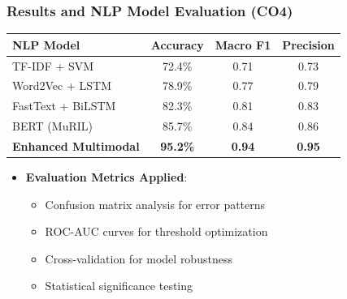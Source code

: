 \documentclass{beamer}
\begin{document}
\begin{frame}
\frametitle{Results and NLP Model Evaluation (CO4)}
\begin{table}
\centering
\begin{tabular}{lccc}
\toprule
\textbf{NLP Model} & \textbf{Accuracy} & \textbf{Macro F1} & \textbf{Precision} \\
\midrule
TF-IDF + SVM & 72.4\% & 0.71 & 0.73 \\
Word2Vec + LSTM & 78.9\% & 0.77 & 0.79 \\
FastText + BiLSTM & 82.3\% & 0.81 & 0.83 \\
BERT (MuRIL) & 85.7\% & 0.84 & 0.86 \\
\textbf{Enhanced Multimodal} & \textbf{95.2\%} & \textbf{0.94} & \textbf{0.95} \\
\bottomrule
\end{tabular}
\end{table}

\begin{itemize}
    \item \textbf{Evaluation Metrics Applied}:
    \begin{itemize}
        \item Confusion matrix analysis for error patterns
        \item ROC-AUC curves for threshold optimization
        \item Cross-validation for model robustness
        \item Statistical significance testing
    \end{itemize}
\end{itemize}
\end{frame}
\end{document}
